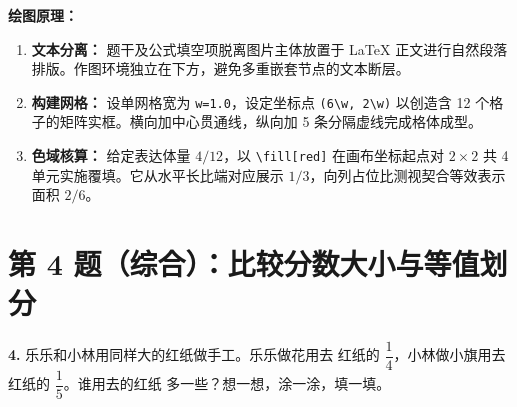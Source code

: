 \vspace{0.5cm}
\textbf{绘图原理：}
\begin{enumerate}
    \item \textbf{文本分离：} 题干及公式填空项脱离图片主体放置于 LaTeX 正文进行自然段落排版。作图环境独立在下方，避免多重嵌套节点的文本断层。
    \item \textbf{构建网格：} 设单网格宽为 \texttt{w=1.0}，设定坐标点 \texttt{(6\textbackslash w, 2\textbackslash w)} 以创造含 12 个格子的矩阵实框。横向加中心贯通线，纵向加 5 条分隔虚线完成格体成型。
    \item \textbf{色域核算：} 给定表达体量 $4/12$，以 \texttt{\textbackslash fill[red]} 在画布坐标起点对 $2\times2$ 共 4 单元实施覆填。它从水平长比端对应展示 $1/3$，向列占位比测视契合等效表示面积 $2/6$。
\end{enumerate}

\vspace{1.5cm}

\section*{第 4 题（综合）：比较分数大小与等值划分}

\textbf{4.} 乐乐和小林用同样大的红纸做手工。乐乐做花用去
红纸的 $\dfrac{1}{4}$，小林做小旗用去红纸的 $\dfrac{1}{5}$。谁用去的红纸
多一些？想一想，涂一涂，填一填。

